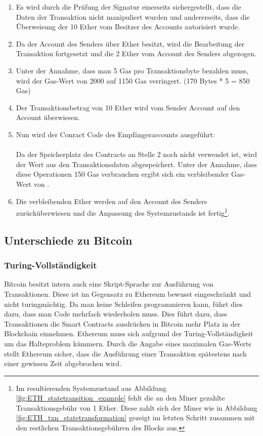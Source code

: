 \begin{enumerate}
\item Es wird durch die Prüfung der Signatur einerseits sichergestellt, dass die Daten der Transaktion nicht manipuliert wurden und andererseits, dass die Überweisung der 10 Ether vom Besitzer des Accounts  autorisiert wurde. 
\item Da der Account des Senders über  Ether besitzt, wird die Bearbeitung der Transaktion fortgesetzt und die 2 Ether vom Account des Senders abgezogen.
\item Unter der Annahme, dass man 5 Gas pro Transaktionsbyte bezahlen muss, wird der Gas-Wert von 2000 auf 1150 Gas verringert. (170 Bytes * 5 = 850 Gas) 
\item Der Transaktionsbetrag von 10 Ether wird vom Sender Account  auf den Account  überwiesen.
\item Nun wird der Conract Code des Empfängeraccounts ausgeführt:\\ \\
Da der Speicherplatz des Contracts an Stelle 2 noch nicht verwendet ist, wird  der Wert  aus den Transaktionsdaten abgespeichert. Unter der Annahme, dass diese Operationen 150 Gas verbrauchen ergibt sich ein verbleibender Gas-Wert von . 
\item Die verbleibenden  Ether werden auf den Account des Senders zurücküberwiesen und die Anpassung des Systemzustands ist fertig\footnote{Im resultierenden Systemzustand aus Abbildung \ref{fig:ETH_statetransition_example} fehlt die an den Miner gezahlte Transaktionsgebühr von 1 Ether. Diese zahlt sich der Miner wie in Abbildung \ref{fig:ETH_txn_statetransformation} gezeigt im letzten Schritt zusammen mit den restlichen Transaktionsgebühren des Blocks aus.}.
\end{enumerate}

\subsection{Unterschiede zu Bitcoin}\label{eth_grundlagen_btc_diff} 
\subsubsection{Turing-Vollständigkeit}
Bitcoin besitzt intern auch eine Skript-Sprache zur Ausführung von Transaktionen. Diese ist im Gegensatz zu Ethereum bewusst eingeschränkt und nicht turingmächtig. Da man keine Schleifen programmieren kann, führt dies dazu, dass man Code mehrfach wiederholen muss. Dies führt dazu, dass Transaktionen die Smart Contracts ausdrücken in Bitcoin mehr Platz in der Blockchain einnehmen. Ethereum muss sich aufgrund der Turing-Vollständigkeit um das Halteproblem kümmern. Durch die Angabe eines maximalen Gas-Werts stellt Ethereum sicher, dass die Ausführung einer Transaktion spätestens nach einer gewissen Zeit abgebrochen wird. 

